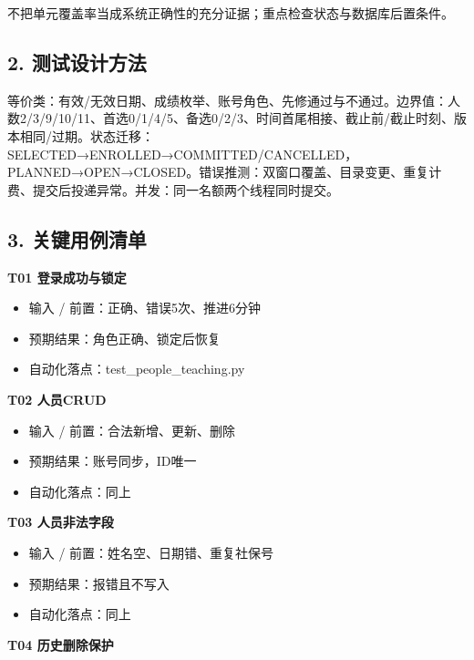 \documentclass[UTF8,11pt,a4paper]{ctexart}
\providecommand{\tightlist}{\setlength{\itemsep}{0pt}\setlength{\parskip}{0pt}}
\begin{document}
不把单元覆盖率当成系统正确性的充分证据；重点检查状态与数据库后置条件。

\hypertarget{2-ux6d4bux8bd5ux8bbeux8ba1ux65b9ux6cd5}{%
\subsection{2.
测试设计方法}\label{2-ux6d4bux8bd5ux8bbeux8ba1ux65b9ux6cd5}}

等价类：有效/无效日期、成绩枚举、账号角色、先修通过与不通过。边界值：人数2/3/9/10/11、首选0/1/4/5、备选0/2/3、时间首尾相接、截止前/截止时刻、版本相同/过期。状态迁移：SELECTED→ENROLLED→COMMITTED/CANCELLED，PLANNED→OPEN→CLOSED。错误推测：双窗口覆盖、目录变更、重复计费、提交后投递异常。并发：同一名额两个线程同时提交。

\hypertarget{3-ux5173ux952eux7528ux4f8bux6e05ux5355}{%
\subsection{3.
关键用例清单}\label{3-ux5173ux952eux7528ux4f8bux6e05ux5355}}

\textbf{T01 登录成功与锁定}

\begin{itemize}
\tightlist
\item
  输入 / 前置：正确、错误5次、推进6分钟
\item
  预期结果：角色正确、锁定后恢复
\item
  自动化落点：test\_\allowbreak{}people\_\allowbreak{}teaching.py
\end{itemize}

\textbf{T02 人员CRUD}

\begin{itemize}
\tightlist
\item
  输入 / 前置：合法新增、更新、删除
\item
  预期结果：账号同步，ID唯一
\item
  自动化落点：同上
\end{itemize}

\textbf{T03 人员非法字段}

\begin{itemize}
\tightlist
\item
  输入 / 前置：姓名空、日期错、重复社保号
\item
  预期结果：报错且不写入
\item
  自动化落点：同上
\end{itemize}

\textbf{T04 历史删除保护}
\end{document}
